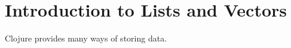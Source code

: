 \section{Introduction to Lists and Vectors}\label{sec:list-vectors}
Clojure provides many ways of storing data. 

